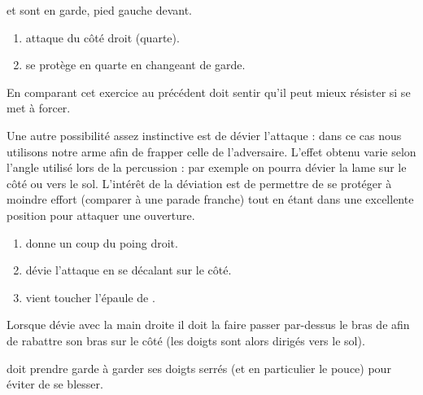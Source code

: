 \begin{exercice}

	\A et \D sont en garde, pied gauche devant.

	\begin{enumerate}
		\item \A attaque \D du côté droit (quarte).
		
		\item \D se protège en quarte en changeant de garde.
	\end{enumerate}

	En comparant cet exercice au précédent \D doit sentir qu'il peut mieux résister si \A se met à forcer.
\end{exercice}


Une autre possibilité assez instinctive est de dévier l'attaque : dans ce cas nous utilisons notre arme afin de frapper celle de l'adversaire.
L'effet obtenu varie selon l'angle utilisé lors de la percussion : par exemple on pourra dévier la lame sur le côté ou vers le sol.
L'intérêt de la déviation est de permettre de se protéger à moindre effort (comparer à une parade franche) tout en étant dans une excellente position pour attaquer une ouverture.


\begin{exercice}

	\begin{enumerate}
		\item \A donne un coup du poing droit.
		
		\item \D dévie l'attaque en se décalant sur le côté.
		
		\item \D vient toucher l'épaule de \A.
	\end{enumerate}

	Lorsque \D dévie avec la main droite il doit la faire passer par-dessus le bras de \A afin de rabattre son bras sur le côté (les doigts sont alors dirigés vers le sol).

	\D doit prendre garde à garder ses doigts serrés (et en particulier le pouce) pour éviter de se blesser.
\end{exercice}


